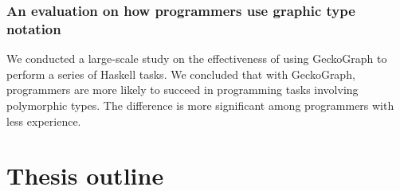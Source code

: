 \subsubsection{An evaluation on how programmers use graphic type notation}

We conducted a large-scale study on the effectiveness of using GeckoGraph to perform a series of Haskell tasks. We concluded that with GeckoGraph, programmers are more likely to succeed in programming tasks involving polymorphic types. The difference is more significant among programmers with less experience.










\section{Thesis outline}

